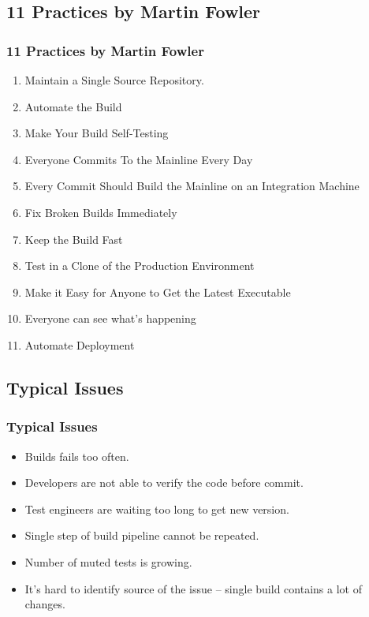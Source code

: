 \subsection[]{11 Practices by Martin Fowler}
\begin{frame}
\frametitle{11 Practices by Martin Fowler}
\begin{enumerate}
	\item Maintain a Single Source Repository.
	\item Automate the Build
	\item Make Your Build Self-Testing
	\item Everyone Commits To the Mainline Every Day
	\item Every Commit Should Build the Mainline on an Integration Machine
	\item Fix Broken Builds Immediately
	\item Keep the Build Fast
	\item Test in a Clone of the Production Environment
	\item Make it Easy for Anyone to Get the Latest Executable
	\item Everyone can see what's happening
	\item Automate Deployment
\end{enumerate}
\end{frame}


\subsection[]{Typical Issues}
\begin{frame}
\frametitle{Typical Issues}
\begin{itemize}
	\item Builds fails too often.
	\item Developers are not able to verify the code before commit.
	\item Test engineers are waiting too long to get new version.
	\item Single step of build pipeline cannot be repeated.
	\item Number of muted tests is growing.
	\item It’s hard to identify source of the issue – single build contains a lot of changes.
\end{itemize}
\end{frame}

